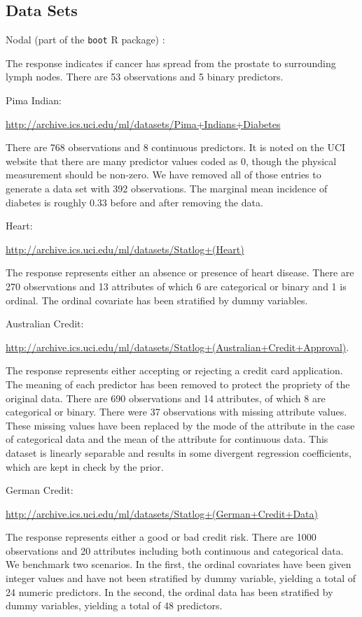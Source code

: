 \documentclass[11pt]{article}
\begin{document}
\subsection{Data Sets}

\begin{outline}

\1 Nodal (part of the \texttt{boot} R package) :

The response indicates if cancer has spread from the prostate to surrounding
lymph nodes.  There are 53 observations and 5 binary predictors.

\1 Pima Indian:

\url{http://archive.ics.uci.edu/ml/datasets/Pima+Indians+Diabetes}

There are 768 observations and 8 continuous predictors.  It is noted on the UCI
website that there are many predictor values coded as 0, though the physical
measurement should be non-zero.  We have removed all of those entries to
generate a data set with 392 observations.  The marginal mean incidence of
diabetes is roughly 0.33 before and after removing the data.

\1 Heart:

\url{http://archive.ics.uci.edu/ml/datasets/Statlog+(Heart)}

The response represents either an absence or presence of heart disease.  There
are 270 observations and 13 attributes of which 6 are categorical or binary and
1 is ordinal.  The ordinal covariate has been stratified by dummy variables.

\1 Australian Credit: 

\url{http://archive.ics.uci.edu/ml/datasets/Statlog+(Australian+Credit+Approval)}.

The response represents either accepting or rejecting a credit card application.
The meaning of each predictor has been removed to protect the propriety of the
original data.  There are 690 observations and 14 attributes, of which 8 are
categorical or binary.  There were 37 observations with missing attribute
values.  These missing values have been replaced by the mode of the attribute in
the case of categorical data and the mean of the attribute for continuous data.
This dataset is linearly separable and results in some divergent regression
coefficients, which are kept in check by the prior.

\1 German Credit: 

\url{http://archive.ics.uci.edu/ml/datasets/Statlog+(German+Credit+Data)}

The response represents either a good or bad credit risk.  There are 1000
observations and 20 attributes including both continuous and categorical data.
We benchmark two scenarios.  In the first, the ordinal covariates have been
given integer values and have not been stratified by dummy variable, yielding a
total of 24 numeric predictors.  In the second, the ordinal data has been
stratified by dummy variables, yielding a total of 48 predictors.

\end{outline}
\end{document}
